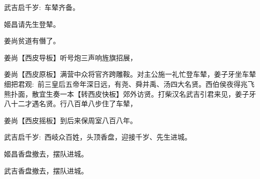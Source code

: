 {\vspace{5pt}

\textrm{武吉\hspace{30pt}启千岁:~车辇齐备。}

\textrm{姬昌\hspace{30pt}请先生登辇。}

\textrm{姜尚\hspace{30pt}贫道有僭了。}

\textrm{姜尚\hspace{30pt}【{\akai 西皮导板}】听号炮三声响旌旗招展，}

\setlength{\hangindent}{52pt}   %
\textrm{姜尚\hspace{30pt}【{\akai 西皮原板}】满营中众将官齐跨雕鞍。对主公施一礼忙登车辇，姜子牙坐车辇细把君观:~前三皇后五帝年深日远，有尧、舜并禹、汤四大名贤。西伯侯夜得兆飞熊扑面，散宜生奏一本【{\footnotesize 转}{\akai 西皮快板}】郊外访贤。打柴汉名武吉引君来见，姜子牙八十二才遇名贤。行八百单八步住了车辇，}

\textrm{姜尚\hspace{30pt}【{\akai 西皮摇板}】到后来保周室八百八年。}

\textrm{武吉\hspace{30pt}启千岁:~西岐众百姓，头顶香盘，迎接千岁、先生进城。}

\textrm{姬昌\hspace{30pt}香盘撤去，摆队进城。}

\textrm{武吉\hspace{30pt}香盘撤去，摆队进城。}
}

